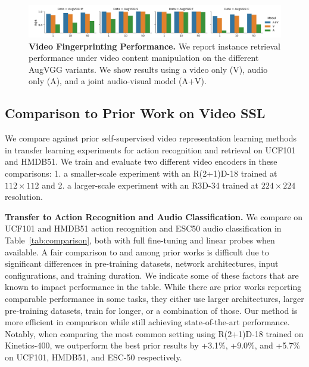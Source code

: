 \documentclass[letterpaper]{article} %
\begin{document}
\begin{figure}[t]
    \centering
    \includegraphics[width=\linewidth]{figures/vgg_plot.png}
    \caption{\textbf{Video Fingerprinting Performance.}
    We report instance retrieval performance under video content manipulation on the different AugVGG variants.
    We show results using a video only (V), audio only (A), and a joint audio-visual model (A+V).
    }
    \label{fig:comp_augvgg}
\end{figure}

\subsection{Comparison to Prior Work on Video SSL}

We compare against prior self-supervised video representation learning methods in transfer learning experiments for action recognition and retrieval on UCF101 and HMDB51.
We train and evaluate two different video encoders in these comparisons: 1. a smaller-scale experiment with an R(2+1)D-18 trained at $112\times112$ and 2. a larger-scale experiment with an R3D-34 trained at $224\times224$ resolution.


\noindent \textbf{Transfer to Action Recognition and Audio Classification.}
We compare on UCF101 and HMDB51 action recognition and ESC50 audio classification in Table~\ref{tab:comparison}, both with full fine-tuning and linear probes when available.
A fair comparison to and among prior works is difficult due to significant differences in pre-training datasets, network architectures, input configurations, and training duration.
We indicate some of these factors that are known to impact performance in the table.
While there are prior works \cite{recasens2021broaden,qian2020spatiotemporal} reporting comparable performance in some tasks, they either use larger architectures, larger pre-training datasets, train for longer, or a combination of those.
Our method is more efficient in comparison while still achieving state-of-the-art performance.
Notably, when comparing the most common setting using R(2+1)D-18 trained on Kinetics-400, we outperform the best prior results by +3.1\%, +9.0\%, and +5.7\% on UCF101, HMDB51, and ESC-50 respectively.
\end{document}
